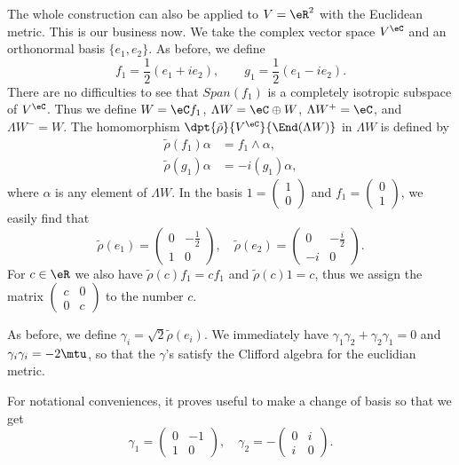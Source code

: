 The whole construction can also be applied to $V=\eR^2$ with the Euclidean metric. This is our business now. We take the complex vector space $V^{\eC}$ and an orthonormal basis $\{e_1,e_2\}$. As before, we define
 \[
f_1=\frac{1}{2}(e_1+ie_2),\qquad g_1=\frac{1}{2}(e_1-ie_2).
\]
There are no difficulties to see that $Span(f_1)$ is a completely isotropic subspace of $V^{\eC}$. Thus we define $W=\eC f_1$, $\Lambda W =\eC\oplus W$, $\Lambda W^+=\eC$, and $\Lambda W^-=W$. The homomorphism $\dpt{\tilde\rho}{V^{\eC}}{\End(\Lambda W )}$ in $\Lambda W $ is defined by
\begin{equation}
\begin{split}
 \tilde\rho(f_1)\alpha&=f_1\wedge\alpha,\\
 \tilde\rho(g_1)\alpha&=-i(g_1)\alpha,
\end{split}
\end{equation}
where $\alpha$ is any element of $\Lambda W $. In the basis $1=\begin{pmatrix}
1 \\
0
\end{pmatrix} $ and $f_1=\begin{pmatrix}
0 \\
1
\end{pmatrix} $, we easily find that
\[
 \tilde\rho(e_1)=\begin{pmatrix}
 0 & -\frac{1}{2} \\
 1 & 0
 \end{pmatrix},\quad\tilde\rho(e_2)=\begin{pmatrix}
 0 & -\frac{i}{2} \\
 -i & 0
 \end{pmatrix}.\]
For $c\in\eR$ we	 also have $\tilde\rho(c)f_1=cf_1$ and $\tilde\rho(c)1=c$, thus we assign the matrix $\begin{pmatrix}
c & 0 \\
0 & c
\end{pmatrix}$ to the number $c$.

As before, we define $\gamma_i=\sqrt{2}\tilde\rho(e_i)$. We immediately have $\gamma_1\gamma_2+\gamma_2\gamma_1=0$ and $\gamma_i\gamma_i=-2\mtu$, so that the $\gamma$'s satisfy the Clifford algebra for the euclidian metric.

For notational conveniences, it proves useful to make a change of basis so that we get
\begin{equation}\label{gammaR2}
\gamma_1=\begin{pmatrix}
0 & -1 \\
1 & 0
\end{pmatrix},\quad\gamma_2=-\begin{pmatrix}
0 & i \\
i & 0
\end{pmatrix}.
\end{equation}

